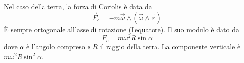 \documentclass[a4paper]{article}
\begin{document}
Nel caso della terra, la forza di Coriolis è data da
\[
    \vec{F}_c = -m\vec{\omega} \wedge (\vec{\omega} \wedge \vec{r})
\]
È sempre ortogonale all'asse di rotazione (l'equatore).
Il suo modulo è dato da
\[
    F_c = m\omega^2 R \sin\alpha
\]
dove \(\alpha\) è l'angolo compreso e \(R\) il raggio della terra.
La componente verticale è \(m \omega^2 R \sin^2\alpha\).

%
\end{document}
